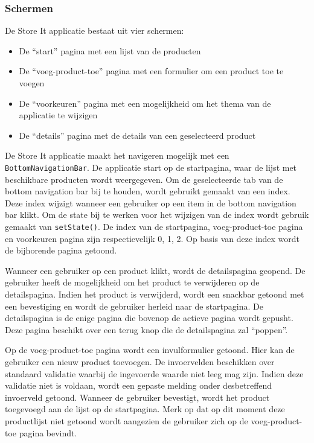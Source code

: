 \subsubsection{Schermen}
De Store It applicatie bestaat uit vier schermen: 
\begin{itemize}
    \item De ``start'' pagina met een lijst van de producten
    \item De ``voeg-product-toe'' pagina met een formulier om een product toe te voegen
    \item De ``voorkeuren'' pagina met een mogelijkheid om het thema van de applicatie te wijzigen
    \item De ``details'' pagina met de details van een geselecteerd product
\end{itemize}

De Store It applicatie maakt het navigeren mogelijk met een \verb|BottomNavigationBar|. De applicatie start op de startpagina, waar de lijst met beschikbare producten wordt weergegeven. Om de geselecteerde tab van de bottom navigation bar bij te houden, wordt gebruikt gemaakt van een index. Deze index wijzigt wanneer een gebruiker op een item in de bottom navigation bar klikt. Om de state bij te werken voor het wijzigen van de index wordt gebruik gemaakt van \verb|setState()|. De index van de startpagina, voeg-product-toe pagina en voorkeuren pagina zijn respectievelijk 0, 1, 2.
Op basis van deze index wordt de bijhorende pagina getoond.

Wanneer een gebruiker op een product klikt, wordt de detailspagina geopend. \newline
De gebruiker heeft de mogelijkheid om het product te verwijderen op de detailspagina. Indien het product is verwijderd, wordt een snackbar getoond met een bevestiging en wordt de gebruiker herleid naar de startpagina.
De detailspagina is de enige pagina die bovenop de actieve pagina wordt gepusht. Deze pagina beschikt over een terug knop die de detailspagina zal ``poppen''.

Op de voeg-product-toe pagina wordt een invulformulier getoond. Hier kan de gebruiker een nieuw product toevoegen. De invoervelden beschikken over standaard validatie waarbij de ingevoerde waarde niet leeg mag zijn. Indien deze validatie niet is voldaan, wordt een gepaste melding onder desbetreffend invoerveld getoond. \newline
Wanneer de gebruiker bevestigt, wordt het product toegevoegd aan de lijst op de startpagina. Merk op dat op dit moment deze productlijst niet getoond wordt aangezien de gebruiker zich op de voeg-product-toe pagina bevindt.

